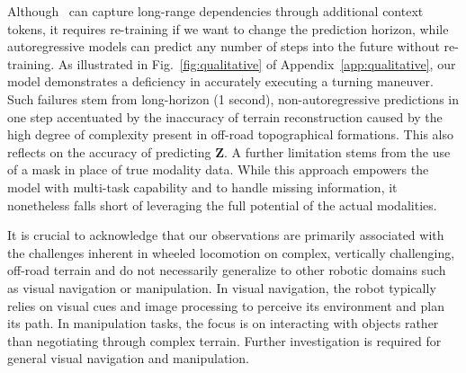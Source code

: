 Although \former~can capture long-range dependencies through additional context tokens, it requires re-training if we want to change the prediction horizon, while autoregressive models can predict any number of steps into the future without re-training. 
As illustrated in Fig.~\ref{fig:qualitative} of Appendix~\ref{app:qualitative}, our model demonstrates a deficiency in accurately executing a turning maneuver. Such failures stem from long-horizon (1 second), non-autoregressive predictions in one step accentuated by the inaccuracy of terrain reconstruction caused by the high degree of complexity present in off-road topographical formations. This also reflects on the accuracy of predicting $\mathbf{Z}$. A further limitation stems from the use of a mask in place of true modality data. While this approach empowers the model with multi-task capability and to handle missing information, it nonetheless falls short of leveraging the full potential of the actual modalities. 

It is crucial to acknowledge that our observations are primarily associated with the challenges inherent in wheeled locomotion on complex, vertically challenging, off-road terrain and do not necessarily generalize to other robotic domains such as visual navigation or manipulation. In visual navigation, the robot typically relies on visual cues and image processing to perceive its environment and plan its path. In manipulation tasks, the focus is on interacting with objects rather than negotiating through complex terrain. 
Further investigation is required for general visual navigation and manipulation.